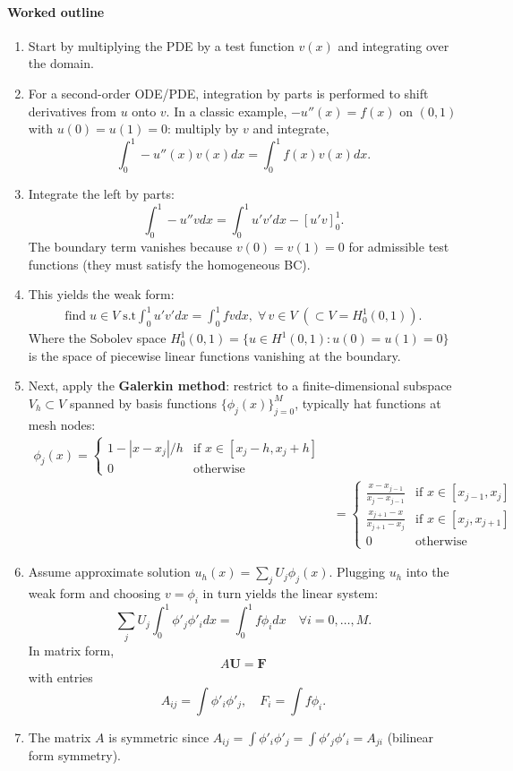 \documentclass[a4paper,11pt]{article}
\begin{document}
\paragraph{Worked outline}
\begin{enumerate}
    \item Start by multiplying the PDE by a test function $v(x)$ and integrating over the domain. 
    \item For a second-order ODE/PDE, integration by parts is performed to shift derivatives from $u$ onto $v$. 
    In a classic example, $-u''(x)=f(x)$ on $(0,1)$ with $u(0)=u(1)=0$: 
    multiply by $v$ and integrate, 
    $$\int_0^1 -u''(x)v(x)dx = \int_0^1 f(x)v(x)dx.$$

    \item Integrate the left by parts: 
    $$\int_0^1 -u'' vdx = \int_0^1 u' v'dx - [u'v]_0^1.$$ 
    The boundary term vanishes because $v(0)=v(1)=0$ for admissible test functions (they must satisfy the homogeneous BC). 
    \item This yields the weak form: 
    \begin{align*}
    \text{find} \; u \in V \;  \text{s.t} \int_0^1 u' v'dx = \int_0^1 f vdx, \; \forall \, v\in V \; (\subset V=H^1_0(0,1)).
    \end{align*}
    Where the Sobolev space $H^1_0(0,1) = \{u \in H^1(0,1) : u(0)=u(1)=0\}$ is the space of piecewise linear functions vanishing at the boundary.
    \item Next, apply the \textbf{Galerkin method}: restrict to a finite-dimensional subspace $V_h \subset V$ spanned by basis functions $\{\phi_j(x)\}_{j=0}^M$, typically hat functions at mesh nodes:
    \begin{align*}
        \phi_j(x) = \begin{cases}
            1 - |x-x_j|/h & \text{if } x \in [x_j-h,x_j+h] \\
            0 & \text{otherwise}
        \end{cases}\\
        &=
        \begin{cases}
            \frac{x-x_{j-1}}{x_j-x_{j-1}} & \text{if } x \in [x_{j-1},x_j] \\
            \frac{x_{j+1}-x}{x_{j+1}-x_j} & \text{if } x \in [x_j,x_{j+1}] \\
            0 & \text{otherwise}
        \end{cases}
        \tag{(hat function)}
    \end{align*}
    \item Assume approximate solution $u_h(x)=\sum_{j} U_j \phi_j(x).$
    Plugging $u_h$ into the weak form and choosing $v=\phi_i$ in turn yields the linear system: 
    $$\sum_j U_j \int_0^1 \phi'_j \phi'_idx = \int_0^1 f\phi_idx \quad \forall i=0,\ldots,M.$$
    In matrix form, 
    $$A\mathbf{U} = \mathbf{F}$$ 
    with entries 
    $$A_{ij}=\int \phi'_i \phi'_j, \quad F_i=\int f\phi_i.$$
    \item The matrix $A$ is symmetric since $A_{ij} = \int \phi'_i \phi'_j = \int \phi'_j \phi'_i = A_{ji}$ (bilinear form symmetry).
\end{enumerate}
\end{document}
